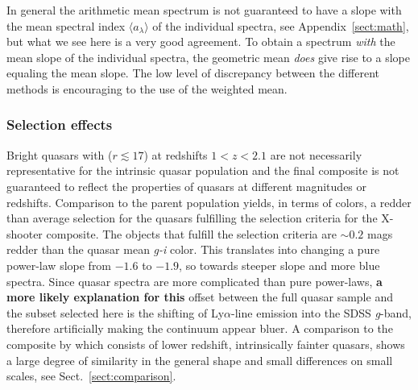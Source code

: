 \documentclass{aa}    %
\newcommand{\sectionname}{Sect.}
\newcommand{\Sect}[1]{\sectionname~\ref{sect:#1}}
\newcommand{\sect}[1]{\Sect{#1}}
\newcommand{\App}[1]{Appendix~\ref{sect:#1}}
\newcommand{\app}[1]{\App{#1}}
\newcommand{\sectlabel}[1]{\label{sect:#1}}
\newcommand{\lya}{Ly$\alpha$}
\begin{document}
In general the arithmetic mean spectrum is not guaranteed to have a
slope with the mean spectral index $\langle a_\lambda\rangle$ of the
individual spectra, see \app{math}, but what we see here is a very
good agreement. To obtain a spectrum \textit{with} the mean slope of
the individual spectra, the geometric mean \textit{does} give rise to
a slope equaling the mean slope. The low level of discrepancy between
the different methods is encouraging to the use of the weighted mean.

\subsubsection{Selection effects}  \sectlabel{Selection effects}
Bright quasars with ($r \lesssim 17$) at redshifts $1 < z < 2.1$ are
not necessarily representative for the intrinsic quasar population
\citep{Paris2014} and the final composite is not guaranteed to reflect
the properties of quasars at different magnitudes or
redshifts. Comparison to the parent population yields, in terms of
colors, a redder than average selection for the quasars fulfilling the
selection criteria for the X-shooter composite. The objects that
fulfill the selection criteria are $\sim 0.2$ mags redder than the
quasar mean \textit{g-i} color. This translates into changing a pure
power-law slope from $-1.6$ to $-1.9$, so towards steeper slope and
more blue spectra. Since quasar spectra are more complicated than pure
power-laws,\textbf{ a more likely explanation for this} offset between the
full quasar sample and the subset selected here is the shifting of
\lya-line emission into the SDSS \textit{g}-band, therefore artificially making
the continuum appear bluer.  A comparison to the composite by
\citet{VandenBerk2001} which consists of lower redshift, intrinsically
fainter quasars, shows a large degree of similarity in the general
shape and small differences on small scales, see \sect{comparison}.
\end{document}
